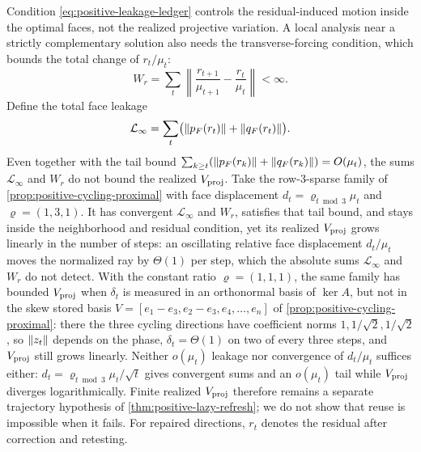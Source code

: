 Condition \eqref{eq:positive-leakage-ledger} controls the residual-induced
motion inside the optimal faces, not the realized projective variation.  A
local analysis near a strictly complementary solution also needs the
transverse-forcing condition, which bounds the total change of $r_t/\mu_t$:
\begin{equation}
 W_r=\sum_t\left\|
 \frac{r_{t+1}}{\mu_{t+1}}-\frac{r_t}{\mu_t}\right\|<\infty.             \label{eq:positive-transverse-ledger}
\end{equation}
Define the total face leakage
\begin{equation}
 \mathcal L_\infty=
 \sum_t\bigl(\lVert p_F(r_t)\rVert+\lVert q_F(r_t)\rVert\bigr).       \label{eq:positive-total-face-leakage}
\end{equation}
Even together with the tail bound
$\sum_{k\geq t}(\lVert p_F(r_k)\rVert+\lVert q_F(r_k)\rVert)=O(\mu_t)$, the sums
$\mathcal L_\infty$ and $W_r$ do not bound the realized $V_{\rm proj}$.  Take the
row-$3$-sparse family of \cref{prop:positive-cycling-proximal} with face
displacement $d_t=\varrho_{t\bmod3}\mu_t$ and $\varrho=(1,3,1)$.  It has
convergent $\mathcal L_\infty$ and $W_r$, satisfies that tail bound, and stays
inside the neighborhood and residual condition, yet its realized
$V_{\rm proj}$ grows linearly in the number of steps: an oscillating relative
face displacement $d_t/\mu_t$ moves the normalized ray by $\Theta(1)$ per
step, which the absolute sums $\mathcal L_\infty$ and $W_r$ do not detect.  With the constant ratio
$\varrho=(1,1,1)$, the same family has bounded $V_{\rm proj}$ when $\delta_t$
is measured in an orthonormal basis of $\ker A$, but not in the skew stored basis
$V=[e_1-e_3,e_2-e_3,e_4,\ldots,e_n]$ of
\cref{prop:positive-cycling-proximal}: there the three cycling directions
have coefficient norms $1,1/\sqrt2,1/\sqrt2$, so $\lVert z_t\rVert$ depends on the
phase, $\delta_t=\Theta(1)$ on two of every three steps, and
$V_{\rm proj}$ still grows linearly.  Neither $o(\mu_t)$ leakage nor
convergence of $d_t/\mu_t$ suffices either:
$d_t=\varrho_{t\bmod3}\mu_t/\sqrt t$ gives convergent sums and an
$o(\mu_t)$ tail while $V_{\rm proj}$ diverges logarithmically.  Finite
realized $V_{\rm proj}$ therefore remains a separate trajectory hypothesis of
\cref{thm:positive-lazy-refresh}; we do not show that reuse is impossible when
it fails.  For repaired directions, $r_t$ denotes the residual after
correction and retesting.

